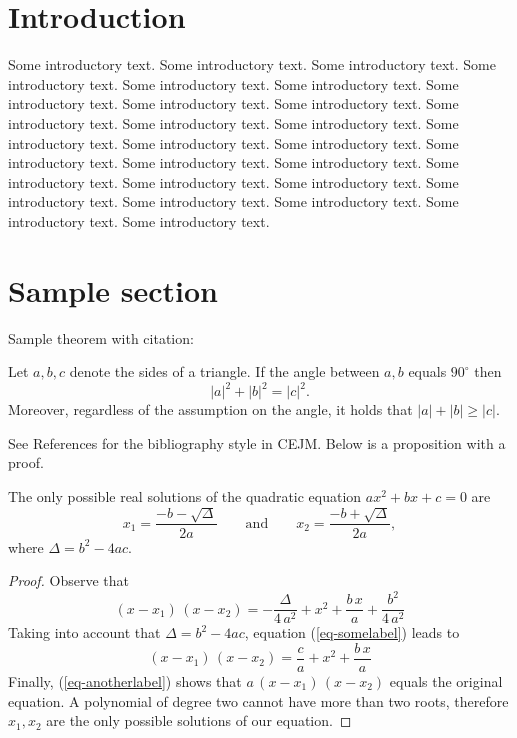 \documentclass[ITESM,PDF]{cej} %
\begin{document}

\section{Introduction }

Some introductory text. Some introductory text. Some introductory text. Some introductory text. Some introductory text. Some introductory text. Some introductory text. Some introductory text. Some introductory text. Some introductory text. Some introductory text. Some introductory text. Some introductory text. Some introductory text. Some introductory text. Some introductory text. Some introductory text. Some introductory text. Some introductory text. Some introductory text. Some introductory text. Some introductory text. Some introductory text. Some introductory text. Some introductory text. Some introductory text.




\section{Sample section}


Sample theorem with citation:

\begin{theorem}\label{Pythagoras-famous}
Let $a,b,c$ denote the sides of a triangle. If the angle between $a,b$ equals $90^\circ$ then
$$|a|^2 + |b|^2 = |c|^2.$$
Moreover, regardless of the assumption on the angle, it holds that $|a|+|b|\ge |c|$.
\end{theorem}

See References for the bibliography style in CEJM.
Below is a proposition with a proof.

\begin{proposition}\label{Standard-stuff}
The only possible real solutions of the quadratic equation $ax^2+bx+c=0$ are
$$x_1 = \frac{-b-\sqrt{\Delta}}{2a} \qquad\text{and}\qquad x_2 = \frac{-b+\sqrt{\Delta}}{2a},$$
where $\Delta = b^2-4ac$.
\end{proposition}

\begin{proof}
Observe that
\begin{equation}
(x-x_1)\,(x-x_2) = -{\frac{\Delta}{4\,a^2}}+x^2+{\frac{b\,x}{a}}+{\frac{b^2}{4\,a^2}}
\label{eq-somelabel}
\end{equation}
Taking into account that $\Delta = b^2-4ac$, equation (\ref{eq-somelabel}) leads to
\begin{equation}
(x-x_1)\,(x-x_2) = \frac{c}{a}+x^2 + \frac{b\,x}{a}
\label{eq-anotherlabel}
\end{equation}
Finally, (\ref{eq-anotherlabel}) shows that $a\,(x-x_1)\,(x-x_2)$ equals the original equation.
A polynomial of degree two cannot have more than two roots, therefore $x_1,x_2$ are the only possible solutions of our equation.
\end{proof}
\end{document}
